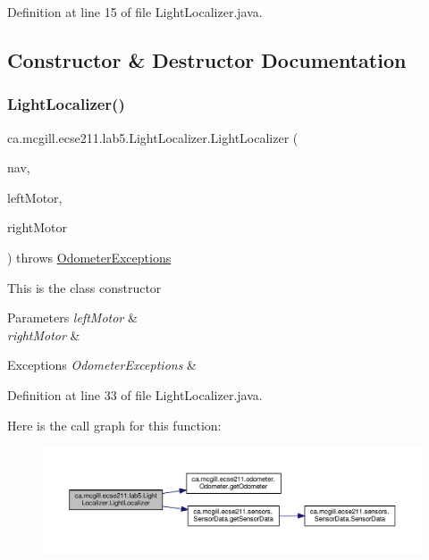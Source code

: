 Definition at line 15 of file Light\+Localizer.\+java.



\subsection{Constructor \& Destructor Documentation}
\mbox{\label{classca_1_1mcgill_1_1ecse211_1_1lab5_1_1_light_localizer_a83dbb9eaea19092e27f6f9acdd35d37a}} 
\subsubsection{\texorpdfstring{Light\+Localizer()}{LightLocalizer()}}
{\footnotesize\ttfamily ca.\+mcgill.\+ecse211.\+lab5.\+Light\+Localizer.\+Light\+Localizer (\begin{DoxyParamCaption}\item[{\hyperlink{classca_1_1mcgill_1_1ecse211_1_1lab5_1_1_navigation}{Navigation}}]{nav,  }\item[{E\+V3\+Large\+Regulated\+Motor}]{left\+Motor,  }\item[{E\+V3\+Large\+Regulated\+Motor}]{right\+Motor }\end{DoxyParamCaption}) throws \hyperlink{classca_1_1mcgill_1_1ecse211_1_1odometer_1_1_odometer_exceptions}{Odometer\+Exceptions}}

This is the class constructor


\begin{DoxyParams}{Parameters}
{\em left\+Motor} & \\
\hline
{\em right\+Motor} & \\
\hline
\end{DoxyParams}

\begin{DoxyExceptions}{Exceptions}
{\em Odometer\+Exceptions} & \\
\hline
\end{DoxyExceptions}


Definition at line 33 of file Light\+Localizer.\+java.

Here is the call graph for this function\+:\nopagebreak
\begin{figure}[H]
\begin{center}
\leavevmode
\includegraphics[width=350pt]{classca_1_1mcgill_1_1ecse211_1_1lab5_1_1_light_localizer_a83dbb9eaea19092e27f6f9acdd35d37a_cgraph}
\end{center}
\end{figure}



